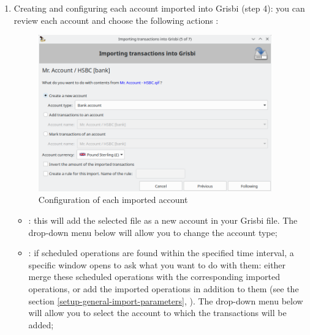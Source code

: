 \begin{enumerate}
	\item Creating and configuring each account imported into Grisbi (step 4): you can review each account and choose the following actions :
	\begin{figure}[htbp]
		\begin{center}
		\includegraphics[width=0.95\textwidth]{image/screenshot/importexport_import_files_setup}
		\end{center}
		\caption{Configuration of each imported account}%
		\label{importexport-import-files-setup-img}
	\end{figure}
		\begin{itemize}
			\item {}:%
			this will add the selected file as a new account in your Grisbi file. The drop-down menu  below will allow you to change the account type;
			\item {}:%
			if scheduled operations are found within the specified time interval, a specific window opens to ask what you want to do with them: either merge these scheduled operations with the corresponding imported operations, or add the imported operations in addition to them (see the section \vref{setup-general-import-parameters}, ). The  drop-down menu below will allow you to select the account to which the transactions will be added;

\end{itemize}
\end{enumerate}
